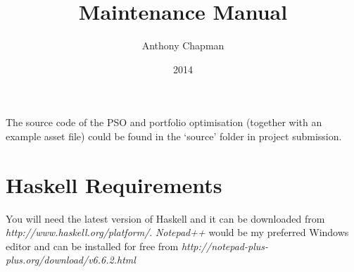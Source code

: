 \documentclass[]{report}
\title{Maintenance Manual}
\author{Anthony Chapman}
\date{2014}
\begin{document}
\maketitle

The source code of the PSO and portfolio optimisation (together with an example asset file) could be found in the `source' folder in project submission.

\section*{Haskell Requirements}
You will need the latest version of Haskell and it can be downloaded from \textit{http://www.haskell.org/platform/}. \textit{Notepad++} would be my preferred Windows editor and can be installed for free from \textit{http://notepad-plus-plus.org/download/v6.6.2.html}
\end{document}
